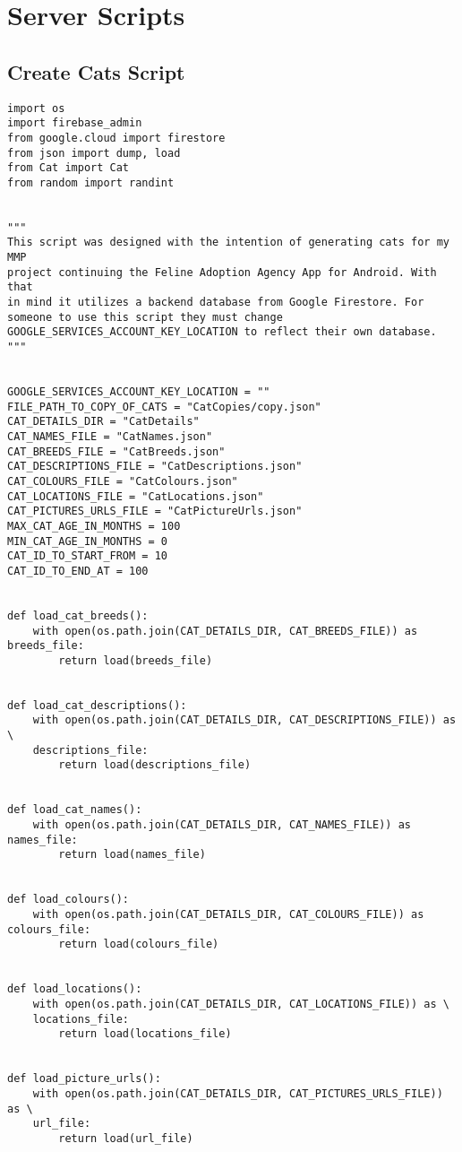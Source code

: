 \section{Server Scripts}

\subsection{Create Cats Script}\label{CREATECATSCRIPT}
\begin{verbatim}
import os
import firebase_admin
from google.cloud import firestore
from json import dump, load
from Cat import Cat
from random import randint


"""
This script was designed with the intention of generating cats for my MMP 
project continuing the Feline Adoption Agency App for Android. With that
in mind it utilizes a backend database from Google Firestore. For 
someone to use this script they must change 
GOOGLE_SERVICES_ACCOUNT_KEY_LOCATION to reflect their own database.
"""


GOOGLE_SERVICES_ACCOUNT_KEY_LOCATION = ""
FILE_PATH_TO_COPY_OF_CATS = "CatCopies/copy.json"
CAT_DETAILS_DIR = "CatDetails"
CAT_NAMES_FILE = "CatNames.json"
CAT_BREEDS_FILE = "CatBreeds.json"
CAT_DESCRIPTIONS_FILE = "CatDescriptions.json"
CAT_COLOURS_FILE = "CatColours.json"
CAT_LOCATIONS_FILE = "CatLocations.json"
CAT_PICTURES_URLS_FILE = "CatPictureUrls.json"
MAX_CAT_AGE_IN_MONTHS = 100
MIN_CAT_AGE_IN_MONTHS = 0
CAT_ID_TO_START_FROM = 10
CAT_ID_TO_END_AT = 100


def load_cat_breeds():
    with open(os.path.join(CAT_DETAILS_DIR, CAT_BREEDS_FILE)) as breeds_file:
        return load(breeds_file)


def load_cat_descriptions():
    with open(os.path.join(CAT_DETAILS_DIR, CAT_DESCRIPTIONS_FILE)) as \
    descriptions_file:
        return load(descriptions_file)


def load_cat_names():
    with open(os.path.join(CAT_DETAILS_DIR, CAT_NAMES_FILE)) as names_file:
        return load(names_file)


def load_colours():
    with open(os.path.join(CAT_DETAILS_DIR, CAT_COLOURS_FILE)) as colours_file:
        return load(colours_file)


def load_locations():
    with open(os.path.join(CAT_DETAILS_DIR, CAT_LOCATIONS_FILE)) as \
    locations_file:
        return load(locations_file)


def load_picture_urls():
    with open(os.path.join(CAT_DETAILS_DIR, CAT_PICTURES_URLS_FILE)) as \
    url_file:
        return load(url_file)



\end{verbatim}
